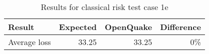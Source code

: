\begin{table}[htbp]

\centering
\begin{tabular}{ l r r r }

\hline
\rowcolor{anti-flashwhite}
\bf{Result} & \bf{Expected} & \bf{OpenQuake} & \bf{Difference}\\
\hline
Average loss & 33.25 & 33.25 & 0\% \\
\hline
\end{tabular}

\caption{Results for classical risk test case 1e}
\label{tab:result-cr-1e}
\end{table}